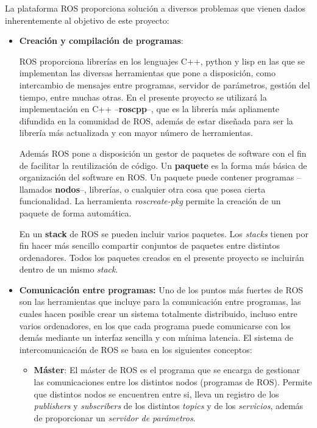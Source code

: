 \documentclass[12pt, a4paper]{report}
\begin{document}
La plataforma ROS proporciona solución a diversos problemas que vienen dados inherentemente al objetivo de este proyecto:

\begin{itemize}

\item \textbf{Creación y compilación de programas}: 

ROS proporciona librerías en los lenguajes C++, python y lisp en las que se implementan las diversas herramientas que pone a disposición, como intercambio de mensajes entre programas, servidor de parámetros, gestión del tiempo, entre muchas otras. En el presente proyecto se utilizará la implementación en C++ --\textbf{roscpp}--, que es la librería más apliamente difundida en la comunidad de ROS, además de estar diseñada para ser la librería más actualizada y con mayor número de herramientas.

Además ROS pone a disposición un gestor de paquetes de software con el fin de facilitar la reutilización de código. Un \textbf{paquete} es la forma más básica de organización del software en ROS. Un paquete puede contener programas --llamados \textbf{nodos}--, librerías, o cualquier otra cosa que posea cierta funcionalidad. La herramienta \textit{roscreate-pkg} permite la creación de un paquete de forma automática. 

En un \textbf{stack} de ROS se pueden incluir varios paquetes. Los \textit{stacks} tienen por fin hacer más sencillo compartir conjuntos de paquetes entre distintos ordenadores. Todos los paquetes creados en el presente proyecto se incluirán dentro de un mismo \textit{stack}.

\item \textbf{Comunicación entre programas:}
Uno de los puntos más fuertes de ROS son las herramientas que incluye para la comunicación entre programas, las cuales hacen posible crear un sistema totalmente distribuido, incluso entre varios ordenadores, en los que cada programa puede comunicarse con los demás mediante un interfaz sencilla y con mínima latencia. El sistema de intercomunicación de ROS se basa en los siguientes conceptos:

\begin{itemize}

\item \textbf{Máster}: El máster de ROS es el programa que se encarga de gestionar las comunicaciones entre los distintos nodos (programas de ROS). Permite que distintos nodos se encuentren entre si, lleva un registro de los \textit{publishers} y \textit{subscribers} de los distintos \textit{topics} y de los \textit{servicios}, además de proporcionar un \textit{servidor de parámetros}.


\end{itemize}
\end{itemize}
\end{document}
